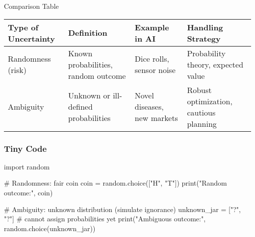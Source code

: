 \documentclass[
  letterpaper,
  DIV=11,
  numbers=noendperiod]{scrreprt}
\newenvironment{Shaded}{\begin{snugshade}}{\end{snugshade}}
\newcommand{\BuiltInTok}[1]{\textcolor[rgb]{0.00,0.23,0.31}{#1}}
\newcommand{\CommentTok}[1]{\textcolor[rgb]{0.37,0.37,0.37}{#1}}
\newcommand{\ImportTok}[1]{\textcolor[rgb]{0.00,0.46,0.62}{#1}}
\newcommand{\NormalTok}[1]{\textcolor[rgb]{0.00,0.23,0.31}{#1}}
\newcommand{\OperatorTok}[1]{\textcolor[rgb]{0.37,0.37,0.37}{#1}}
\newcommand{\StringTok}[1]{\textcolor[rgb]{0.13,0.47,0.30}{#1}}
\begin{document}
Comparison Table

\begin{longtable}[]{@{}
  >{\raggedright\arraybackslash}p{}
  >{\raggedright\arraybackslash}p{}
  >{\raggedright\arraybackslash}p{}
  >{\raggedright\arraybackslash}p{}@{}}
\toprule\noalign{}
\begin{minipage}[b]{\linewidth}\raggedright
Type of Uncertainty
\end{minipage} & \begin{minipage}[b]{\linewidth}\raggedright
Definition
\end{minipage} & \begin{minipage}[b]{\linewidth}\raggedright
Example in AI
\end{minipage} & \begin{minipage}[b]{\linewidth}\raggedright
Handling Strategy
\end{minipage} \\
\midrule\noalign{}
\endhead
\bottomrule\noalign{}
\endlastfoot
Randomness (risk) & Known probabilities, random outcome & Dice rolls,
sensor noise & Probability theory, expected value \\
Ambiguity & Unknown or ill-defined probabilities & Novel diseases, new
markets & Robust optimization, cautious planning \\
\end{longtable}

\subsubsection{Tiny Code}\label{tiny-code-27}

\begin{Shaded}
\begin{Highlighting}[]
\ImportTok{import}\NormalTok{ random}

\CommentTok{\# Randomness: fair coin}
\NormalTok{coin }\OperatorTok{=}\NormalTok{ random.choice([}\StringTok{"H"}\NormalTok{, }\StringTok{"T"}\NormalTok{])}
\BuiltInTok{print}\NormalTok{(}\StringTok{"Random outcome:"}\NormalTok{, coin)}

\CommentTok{\# Ambiguity: unknown distribution (simulate ignorance)}
\NormalTok{unknown\_jar }\OperatorTok{=}\NormalTok{ [}\StringTok{"?"}\NormalTok{, }\StringTok{"?"}\NormalTok{]  }\CommentTok{\# cannot assign probabilities yet}
\BuiltInTok{print}\NormalTok{(}\StringTok{"Ambiguous outcome:"}\NormalTok{, random.choice(unknown\_jar))}
\end{Highlighting}
\end{Shaded}
\end{document}
